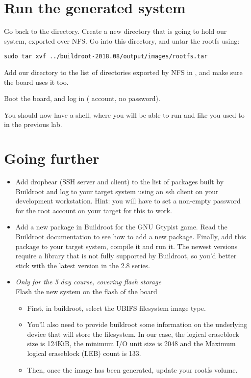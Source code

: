\section{Run the generated system}

Go back to the  directory. Create
a new  directory that is going to hold our system,
exported over NFS. Go into this directory, and untar the rootfs using:

\begin{verbatim}
sudo tar xvf ../buildroot-2018.08/output/images/rootfs.tar
\end{verbatim}

Add our  directory to the list of directories exported
by NFS in , and make sure the board uses it too.

Boot the board, and log in ( account, no password).

You should now have a shell, where you will be able to run
 and  like you used to in the previous
lab.

\section{Going further}

\begin{itemize}

\item Add dropbear (SSH server and client) to the list of packages
  built by Buildroot and log to your target system using an ssh client
  on your development workstation. Hint: you will have to set a
  non-empty password for the root account on your target for this to
  work.

\item Add a new package in Buildroot for the GNU Gtypist game. Read
  the Buildroot documentation to see how to add a new
  package. Finally, add this package to your target system, compile it
  and run it. The newest versions require a library that is not fully
  supported by Buildroot, so you'd better stick with the latest
  version in the 2.8 series.

\item {\em Only for the 5 day course, covering flash storage}\\
    Flash the new system on the flash of the board
  \begin{itemize}
  \item First, in buildroot, select the UBIFS filesystem image type.
  \item You'll also need to provide buildroot some information on the
    underlying device that will store the filesystem. In our case, the
    logical eraseblock size is 124KiB, the minimum I/O unit size is
    2048 and the Maximum logical eraseblock (LEB) count is 133.
  \item Then, once the image has been generated, update your rootfs
    volume.
  \end{itemize}

\end{itemize}

